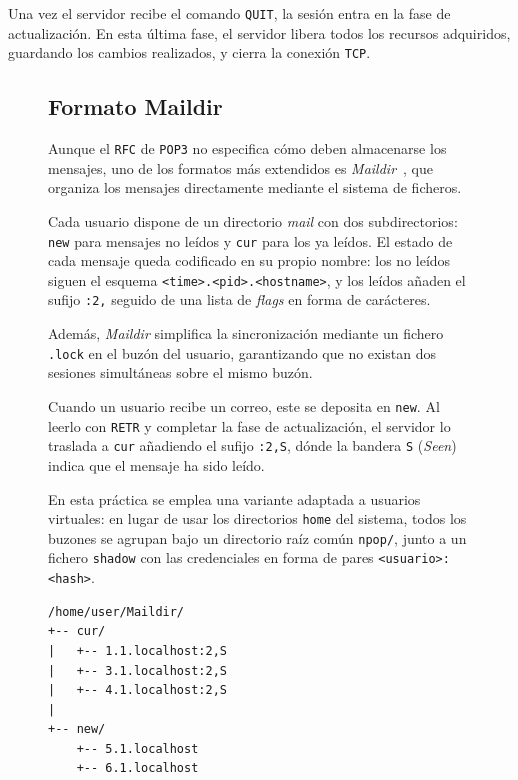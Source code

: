 \documentclass[a4paper]{CSMakotoTechnicalReport}
\begin{document}
Una vez el servidor recibe el comando \texttt{QUIT}, la sesión entra en la fase de actualización. En esta última fase, el servidor libera todos los recursos adquiridos, guardando los cambios realizados, y cierra la conexión \texttt{TCP}.

\begin{figure}[H]
\centering
\begin{minipage}[t]{0.55\textwidth}

\subsection{Formato Maildir}

\medskip
Aunque el \texttt{RFC} de \texttt{POP3} no especifica cómo deben almacenarse los mensajes, uno de los formatos más extendidos es \textit{Maildir}~\cite{maildir}, que organiza los mensajes directamente mediante el sistema de ficheros.

\medskip
Cada usuario dispone de un directorio \textit{mail} con dos subdirectorios: \texttt{new} para mensajes no leídos y \texttt{cur} para los ya leídos. El estado de cada mensaje queda codificado en su propio nombre: los no leídos siguen el esquema \texttt{<time>.<pid>.<hostname>}, y los leídos añaden el sufijo \texttt{:2,} seguido de una lista de \textit{flags} en forma de carácteres. 

\medskip
Además, \textit{Maildir} simplifica la sincronización mediante un fichero \texttt{.lock} en el buzón del usuario, garantizando que no existan dos sesiones simultáneas sobre el mismo buzón.

\medskip
Cuando un usuario recibe un correo, este se deposita en \texttt{new}. Al leerlo con \texttt{RETR} y completar la fase de actualización, el servidor lo traslada a \texttt{cur} añadiendo el sufijo \texttt{:2,S}, dónde la bandera \texttt{S} (\textit{Seen}) indica que el mensaje ha sido leído.

\medskip
En esta práctica se emplea una variante adaptada a usuarios virtuales: en lugar de usar los directorios \texttt{home} del sistema, todos los buzones se agrupan bajo un directorio raíz común \texttt{npop/}, junto a un fichero \texttt{shadow} con las credenciales en forma de pares \texttt{<usuario>:<hash>}.
\end{minipage}
\hfill
\begin{minipage}[t]{0.35\textwidth}

\begin{lstlisting}[language = {}, frame=none, numbers=none, basicstyle=\footnotesize]
/home/user/Maildir/
+-- cur/
|   +-- 1.1.localhost:2,S
|   +-- 3.1.localhost:2,S
|   +-- 4.1.localhost:2,S
|
+-- new/
    +-- 5.1.localhost
    +-- 6.1.localhost
\end{lstlisting}


\end{minipage}
\end{figure}
\end{document}

